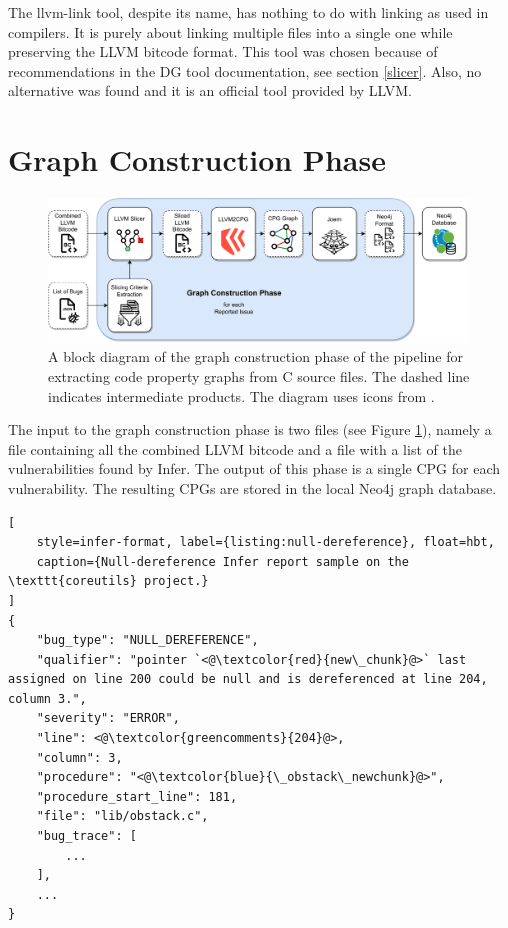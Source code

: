 The llvm-link tool, despite its name, has nothing to do with linking as used in compilers. It is purely about linking multiple files into a single one while preserving the LLVM bitcode format. This tool was chosen because of recommendations in the DG tool documentation, see section \ref{slicer}. Also, no alternative was found and it is an official tool provided by LLVM.

\section{Graph Construction Phase}
\label{construction-phase}

\begin{figure}[hbt]
	\centering
	\includegraphics[width=0.99\textwidth]{figures/construction.drawio.pdf}
	\caption{A block diagram of the graph construction phase of the pipeline for extracting code property graphs from C source files. The dashed line indicates intermediate products. The diagram uses icons from \cite{joern-website, icon-funnel, icon-shiftleft}.}
	\label{figure:pipeline-construction}
\end{figure}

The input to the graph construction phase is two files (see Figure \ref{figure:pipeline-construction}), namely a file containing all the combined LLVM bitcode and a file with a list of the vulnerabilities found by Infer. The output of this phase is a single CPG for each vulnerability. The resulting CPGs are stored in the local Neo4j graph database.

\begin{lstlisting}[
    style=infer-format, label={listing:null-dereference}, float=hbt,
    caption={Null-dereference Infer report sample on the \texttt{coreutils} project.}
]
{
    "bug_type": "NULL_DEREFERENCE",
    "qualifier": "pointer `<@\textcolor{red}{new\_chunk}@>` last assigned on line 200 could be null and is dereferenced at line 204, column 3.",
    "severity": "ERROR",
    "line": <@\textcolor{greencomments}{204}@>,
    "column": 3,
    "procedure": "<@\textcolor{blue}{\_obstack\_newchunk}@>",
    "procedure_start_line": 181,
    "file": "lib/obstack.c",
    "bug_trace": [
        ...
    ],
    ...
}
\end{lstlisting}

